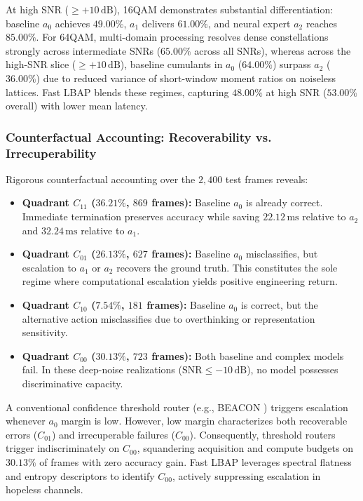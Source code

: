 At high SNR ($\ge +10\,\mathrm{dB}$), 16QAM demonstrates substantial differentiation: baseline $a_0$ achieves $49.00\%$, $a_1$ delivers $61.00\%$, and neural expert $a_2$ reaches $85.00\%$. For 64QAM, multi-domain processing resolves dense constellations strongly across intermediate SNRs ($65.00\%$ across all SNRs), whereas across the high-SNR slice ($\ge +10\,\mathrm{dB}$), baseline cumulants in $a_0$ ($64.00\%$) surpass $a_2$ ($36.00\%$) due to reduced variance of short-window moment ratios on noiseless lattices. Fast LBAP blends these regimes, capturing $48.00\%$ at high SNR ($53.00\%$ overall) with lower mean latency.

\subsubsection{Counterfactual Accounting: Recoverability vs. Irrecuperability}
Rigorous counterfactual accounting over the $2{,}400$ test frames reveals:
\begin{itemize}
    \item \textbf{Quadrant $C_{11}$ ($36.21\%$, $869$ frames):} Baseline $a_0$ is already correct. Immediate termination preserves accuracy while saving $22.12\,\mathrm{ms}$ relative to $a_2$ and $32.24\,\mathrm{ms}$ relative to $a_1$.
    \item \textbf{Quadrant $C_{01}$ ($26.13\%$, $627$ frames):} Baseline $a_0$ misclassifies, but escalation to $a_1$ or $a_2$ recovers the ground truth. This constitutes the sole regime where computational escalation yields positive engineering return.
    \item \textbf{Quadrant $C_{10}$ ($7.54\%$, $181$ frames):} Baseline $a_0$ is correct, but the alternative action misclassifies due to overthinking or representation sensitivity.
    \item \textbf{Quadrant $C_{00}$ ($30.13\%$, $723$ frames):} Both baseline and complex models fail. In these deep-noise realizations ($\mathrm{SNR} \le -10\,\mathrm{dB}$), no model possesses discriminative capacity.
\end{itemize}

A conventional confidence threshold router (e.g., BEACON \cite{liu2026beacon}) triggers escalation whenever $a_0$ margin is low. However, low margin characterizes both recoverable errors ($C_{01}$) and irrecuperable failures ($C_{00}$). Consequently, threshold routers trigger indiscriminately on $C_{00}$, squandering acquisition and compute budgets on $30.13\%$ of frames with zero accuracy gain. Fast LBAP leverages spectral flatness and entropy descriptors to identify $C_{00}$, actively suppressing escalation in hopeless channels.

